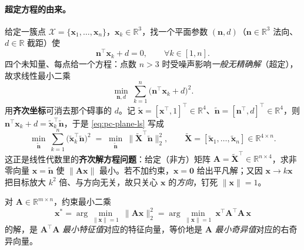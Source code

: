\paragraph{超定方程的由来。}
给定一簇点 $\mathcal{X}=\{\mathbf{x}_1,\dots,\mathbf{x}_n\}$，$\mathbf{x}_k\in\mathbb{R}^3$，找一个平面参数 $(\mathbf{n},d)$（$\mathbf{n}\in\mathbb{R}^3$ 法向、$d\in\mathbb{R}$ 截距）使
\begin{equation}
  \mathbf{n}^\top\mathbf{x}_k+d=0,\qquad \forall k\in[1,n].
  \label{eq:pc-plane-eq}
\end{equation}
四个未知量、每点给一个方程：点数 $n>3$ 时受噪声影响\emph{一般无精确解}（超定），故求线性最小二乘
\begin{equation}
  \min_{\mathbf{n},d}\ \sum_{k=1}^{n}\big(\mathbf{n}^\top\mathbf{x}_k+d\big)^2 .
  \label{eq:pc-plane-ls}
\end{equation}
用\textbf{齐次坐标}可消去那个碍事的 $d$。记 $\tilde{\mathbf{x}}=[\mathbf{x}^\top,1]^\top\in\mathbb{R}^4$、$\tilde{\mathbf{n}}=[\mathbf{n}^\top,d]^\top\in\mathbb{R}^4$，则 $\mathbf{n}^\top\mathbf{x}_k+d=\tilde{\mathbf{x}}_k^\top\tilde{\mathbf{n}}$，于是 \cref{eq:pc-plane-ls} 写成
\begin{equation}
  \min_{\tilde{\mathbf{n}}}\ \sum_{k=1}^{n}\big(\tilde{\mathbf{x}}_k^\top\tilde{\mathbf{n}}\big)^2
  \;=\;\min_{\tilde{\mathbf{n}}}\ \big\|\tilde{\mathbf{X}}^\top\tilde{\mathbf{n}}\big\|_2^2,
  \qquad \tilde{\mathbf{X}}=[\tilde{\mathbf{x}}_1,\dots,\tilde{\mathbf{x}}_n]\in\mathbb{R}^{4\times n}.
  \label{eq:pc-plane-Axb}
\end{equation}
这正是线性代数里的\textbf{齐次解方程问题}：给定（非方）矩阵 $\mathbf{A}=\tilde{\mathbf{X}}^\top\in\mathbb{R}^{n\times4}$，求非零向量 $\mathbf{x}=\tilde{\mathbf{n}}$ 使 $\|\mathbf{A}\mathbf{x}\|$ 最小。若不加约束，$\mathbf{x}=\mathbf{0}$ 给出平凡解；又因 $\mathbf{x}\to k\mathbf{x}$ 把目标放大 $k^2$ 倍、与方向无关，故只关心 $\mathbf{x}$ 的\emph{方向}，钉死 $\|\mathbf{x}\|=1$。

\begin{theorem}[齐次最小二乘 = 最小特征值/奇异向量]\label{thm:pc-fit-homo}
对 $\mathbf{A}\in\mathbb{R}^{m\times n}$，约束最小二乘
\begin{equation}
  \mathbf{x}^\ast=\arg\min_{\|\mathbf{x}\|=1}\ \|\mathbf{A}\mathbf{x}\|_2^2
  =\arg\min_{\|\mathbf{x}\|=1}\ \mathbf{x}^\top\mathbf{A}^\top\mathbf{A}\,\mathbf{x}
  \label{eq:pc-fit-rayleigh}
\end{equation}
的解，是 $\mathbf{A}^\top\mathbf{A}$ \emph{最小特征值}对应的特征向量，等价地是 $\mathbf{A}$ \emph{最小奇异值}对应的右奇异向量。
\end{theorem}

